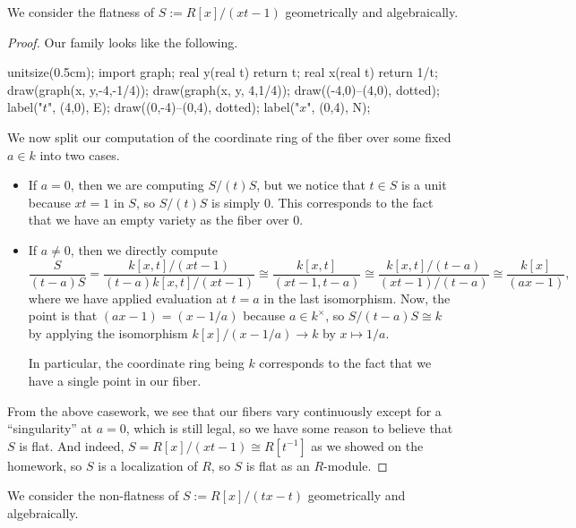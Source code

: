 \begin{exe}
	We consider the flatness of $S:=R[x]/\left(xt-1\right)$ geometrically and algebraically.
\end{exe}
\begin{proof}
	Our family looks like the following.
	\begin{center}
		\begin{asy}
			unitsize(0.5cm);
			import graph;
			real y(real t)
			{
				return t;
			}
			real x(real t)
			{
				return 1/t;
			}
			draw(graph(x, y,-4,-1/4));
			draw(graph(x, y, 4,1/4));
			draw((-4,0)--(4,0), dotted); label("$t$", (4,0), E);
			draw((0,-4)--(0,4), dotted); label("$x$", (0,4), N);
		\end{asy}
	\end{center}
	We now split our computation of the coordinate ring of the fiber over some fixed $a\in k$ into two cases.
	\begin{itemize}
		\item If $a=0$, then we are computing $S/(t)S$, but we notice that $t\in S$ is a unit because $xt=1$ in $S$, so $S/(t)S$ is simply $0$. This corresponds to the fact that we have an empty variety as the fiber over $0$.
		\item If $a\ne0$, then we directly compute
		\[\frac S{(t-a)S}=\frac{k[x,t]/(xt-1)}{(t-a)k[x,t]/(xt-1)}\cong\frac{k[x,t]}{(xt-1,t-a)}\cong\frac{k[x,t]/(t-a)}{(xt-1)/(t-a)}\cong\frac{k[x]}{(ax-1)},\]
		where we have applied evaluation at $t=a$ in the last isomorphism. Now, the point is that $(ax-1)=(x-1/a)$ because $a\in k^\times$, so $S/(t-a)S\cong k$ by applying the isomorphism $k[x]/(x-1/a)\to k$ by $x\mapsto 1/a$.

		In particular, the coordinate ring being $k$ corresponds to the fact that we have a single point in our fiber.
	\end{itemize}
	From the above casework, we see that our fibers vary continuously except for a ``singularity'' at $a=0$, which is still legal, so we have some reason to believe that $S$ is flat. And indeed, $S=R[x]/(xt-1)\cong R\left[t^{-1}\right]$ as we showed on the homework, so $S$ is a localization of $R$, so $S$ is flat as an $R$-module.
\end{proof}
\begin{exe}
	We consider the non-flatness of $S:=R[x]/(tx-t)$ geometrically and algebraically.
\end{exe}
